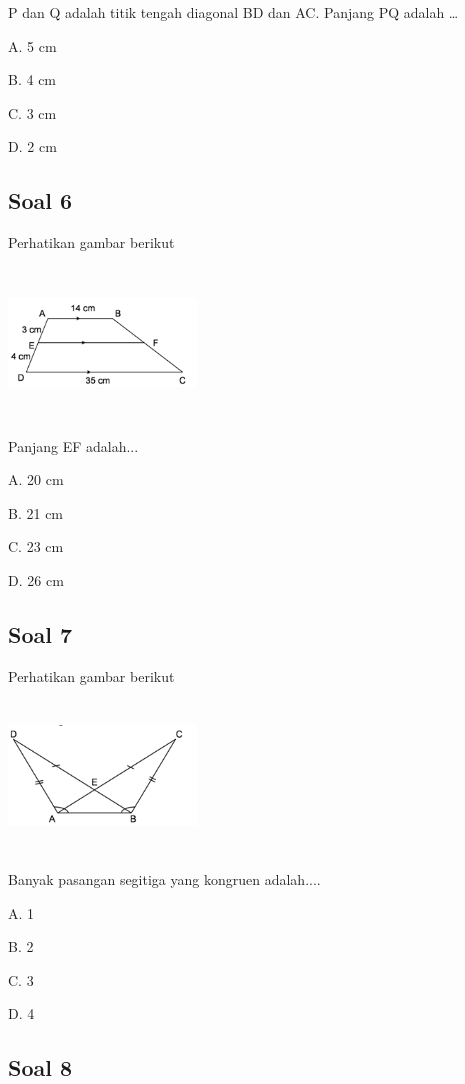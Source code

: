 \documentclass[11pt,fleqn]{book} %
\begin{document}
P dan Q adalah titik tengah diagonal BD dan AC. Panjang PQ adalah … 

A. 5 cm 

B. 4 cm 

C. 3 cm 

D. 2 cm 

\subsection{Soal 6}

Perhatikan gambar berikut

\includegraphics[width = 5cm, height= 4cm]{Pictures/a43.png}

Panjang EF adalah...

A. 20 cm

B. 21 cm

C. 23 cm

D. 26 cm

\subsection{Soal 7}

Perhatikan gambar berikut

\includegraphics[width = 5cm, height= 4cm]{Pictures/a44.png}

Banyak pasangan segitiga yang kongruen adalah....

A. 1

B. 2

C. 3

D. 4

\subsection{Soal 8}
\end{document}
